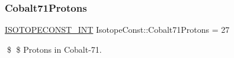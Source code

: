 \subsubsection{\texorpdfstring{Cobalt71\+Protons}{Cobalt71Protons}}
{\footnotesize\ttfamily \mbox{\hyperlink{group___isotope_const-_macros_ga5f18360b3e99483a35c32d789e62621c}{I\+S\+O\+T\+O\+P\+E\+C\+O\+N\+S\+T\+\_\+\+I\+NT}} Isotope\+Const\+::\+Cobalt71\+Protons = 27}

\$ \$ Protons in Cobalt-\/71. 